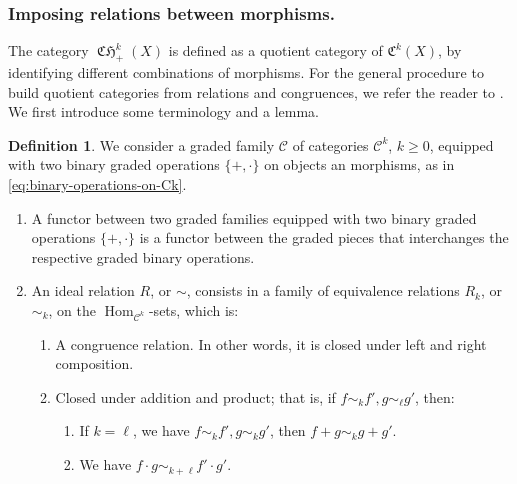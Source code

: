 \documentclass[11pt]{article}
\theoremstyle{plain}
\theoremstyle{definition}
\newtheorem{definition}[theorem]{Definition}
\newcommand{\Ccal}{\mathcal C}
\newcommand{\Cfrak}{\mathfrak C}
\DeclareMathOperator{\CHfrak}{\mathfrak{CH}}
\DeclareMathOperator{\Hom}{Hom}
\begin{document}
\subsubsection*{ Imposing relations between morphisms.} The category $\CHfrak_+^k(X)$ is defined as a quotient category of $\Cfrak^{k}(X)$, by identifying different combinations of morphisms. For the general procedure to build quotient categories from relations and congruences, we refer the reader to \cite[Chap.\,II, Section 8, Proposition 1]{MacLane-cat}. We first introduce some terminology and a lemma.

\begin{definition}\label{def:ideal-relation}
We consider a graded family $\Ccal$ of categories $\Ccal^{k}$, $k\geq 0$, equipped with two binary graded operations $\{+, \cdot \}$ on objects an morphisms, as in \eqref{eq:binary-operations-on-Ck}.

\begin{enumerate}
\item A functor between two graded families equipped with two binary graded operations $\{+, \cdot\}$ is a functor between the graded pieces that interchanges the respective graded binary operations.

\item An ideal relation $R$, or $\sim$, consists in a family of equivalence relations $R_k$, or~$\sim_k$, on the $\Hom_{\Ccal^k}$-sets, which is:
\begin{enumerate}
\item\label{item:ideal-relation-1} A congruence relation. In other words, it is closed under left and right composition.
\item\label{item:ideal-relation-2} Closed under addition and product; that is, if $f \sim_k f', g \sim_\ell g'$, then:
\begin{enumerate}
\item If $k = \ell$, we have $f \sim_k f', g \sim_k g'$, then $f + g \sim_{k} g + g'$.
\item We have $f \cdot g \sim_{k+\ell} f' \cdot g'$.
\end{enumerate}
\end{enumerate}
\end{enumerate}
\end{definition}
\end{document}
